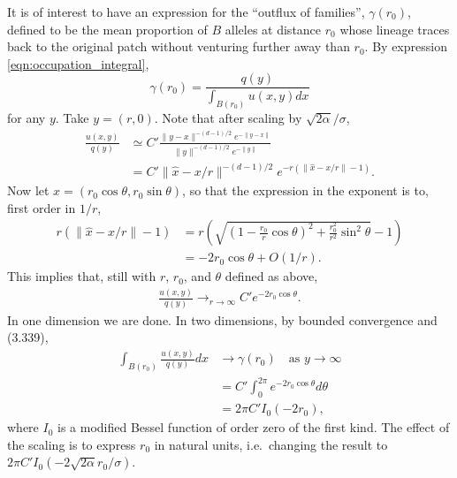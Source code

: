 \documentclass{article}
\begin{document}
It is of interest to have an expression for the ``outflux of families'',
$\gamma(r_0)$, 
defined to be the mean proportion of $B$ alleles at distance $r_0$
whose lineage traces back to the original patch without venturing further away than $r_0$.
By expression \eqref{eqn:occupation_integral},
\[
    \gamma(r_0) = \frac{q(y)}{\int_{B(r_0)} u(x,y) dx}
\]
for any $y$.  
Take $y=(r,0)$.
Note that after scaling by $\sqrt{2\alpha}/\sigma$,
\begin{align}
    \frac{ u(x,y) }{ q(y) } &\simeq C' \frac{ \|y-x\|^{-(d-1)/2} e^{-\|y-x\|} }{ \|y\|^{-(d-1)/2} e^{-\|y\|} } \\
        &= C' \| \hat x - x/r \|^{-(d-1)/2} e^{-r (\|\hat x - x/r\| - 1)} .
\end{align}
Now let $x = (r_0 \cos \theta, r_0 \sin \theta)$,
so that the expression in the exponent is to, first order in $1/r$,
\begin{align}
    r (\|\hat x - x/r\| - 1) &= r \left( \sqrt{ \left( 1 - \frac{r_0}{r} \cos \theta \right)^2 + \frac{r_0^2}{r^2} \sin^2 \theta } - 1 \right ) \\
            &= - 2 r_0 \cos \theta + O(1/r) .
\end{align}
This implies that, still with $r$, $r_0$, and $\theta$ defined as above,
\begin{align}
    \frac{u(x,y)}{q(y)} \longrightarrow_{r \to \infty} C' e^{-2 r_0 \cos \theta} .
\end{align}
In one dimension we are done.
In two dimensions,
by bounded convergence and \citet{gradshteyn2007table} (3.339),
\begin{align}
  \int_{B(r_0)} \frac{u(x,y)}{q(y)} dx &\to \gamma(r_0) \quad \text{as } y \to \infty\\
            &= C' \int_0^{2 \pi} e^{-2 r_0 \cos \theta} d\theta \\
                         &= 2 \pi C' I_0(-2r_0),
\end{align}
where $I_0$ is a modified Bessel function of order zero of the first kind.
The effect of the scaling is to express $r_0$ in natural units, i.e.\ changing the result to $2 \pi C' I_0( - 2 \sqrt{2\alpha} r_0 / \sigma ) $.
\end{document}
